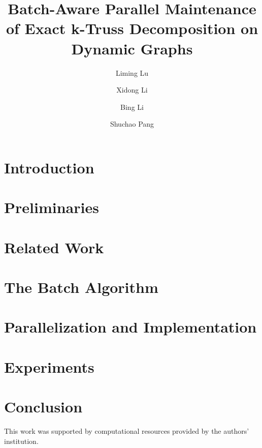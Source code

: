 \documentclass[sigconf, nonacm]{acmart}
\begin{document}
\title{Batch-Aware Parallel Maintenance of Exact k-Truss Decomposition on Dynamic Graphs}

\author{Liming Lu}

\author{Xidong Li}

\author{Bing Li}

\author{Shuchao Pang}

\begin{abstract}

\end{abstract}


\maketitle
\vldbtopmatter

\section{Introduction}


\section{Preliminaries}


\section{Related Work}


\section{The Batch Algorithm}




\section{Parallelization and Implementation}


\section{Experiments}


\section{Conclusion}


\begin{acks}
This work was supported by computational resources provided by the authors' institution.
\end{acks}



\end{document}
